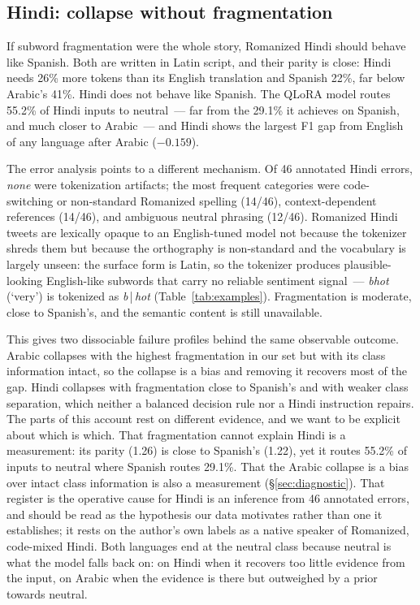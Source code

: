 \documentclass[11pt]{article}
\begin{document}
\subsection{Hindi: collapse without fragmentation}
\label{sec:hindi}

If subword fragmentation were the whole story, Romanized Hindi should behave like
Spanish. Both are written in Latin script, and their parity is close: Hindi needs
26\% more tokens than its English translation and Spanish 22\%, far below Arabic's
41\%. Hindi does not behave like Spanish. The QLoRA model routes 55.2\% of Hindi inputs to neutral~---
far from the 29.1\% it achieves on Spanish, and much closer to Arabic~--- and
Hindi shows the largest F1 gap from English of any language after Arabic
($-0.159$).

The error analysis points to a different mechanism. Of 46 annotated Hindi errors,
\emph{none} were tokenization artifacts; the most frequent categories were
code-switching or non-standard Romanized spelling (14/46), context-dependent
references (14/46), and ambiguous neutral phrasing (12/46). Romanized Hindi tweets are lexically opaque
to an English-tuned model not because the tokenizer shreds them but because the
orthography is non-standard and the vocabulary is largely unseen: the surface form
is Latin, so the tokenizer produces plausible-looking English-like subwords that
carry no reliable sentiment signal~--- \emph{bhot} (`very') is tokenized as
\emph{b}\,|\,\emph{hot} (Table~\ref{tab:examples}). Fragmentation is moderate, close to
Spanish's, and the semantic content is still unavailable.

This gives two dissociable failure profiles behind the same observable outcome.
Arabic collapses with the highest fragmentation in our set but with its class
information intact, so the collapse is a bias and removing it recovers most of the
gap. Hindi collapses with fragmentation close to Spanish's and with weaker class
separation, which neither a balanced decision rule nor a Hindi instruction repairs.
The parts of this account rest on different evidence, and we want to be explicit
about which is which. That fragmentation cannot explain Hindi is a measurement: its
parity (1.26) is close to Spanish's (1.22), yet it routes 55.2\% of inputs to
neutral where Spanish routes 29.1\%. That the Arabic collapse is a bias over intact
class information is also a measurement (\S\ref{sec:diagnostic}). That register is
the operative cause for Hindi is an inference from 46 annotated errors, and should
be read as the hypothesis our data motivates rather than one it establishes; it
rests on the author's own labels as a native speaker of Romanized, code-mixed Hindi.
Both languages end at the neutral class because neutral is what the model falls
back on: on Hindi when it recovers too little evidence from the input, on Arabic
when the evidence is there but outweighed by a prior towards neutral.
\end{document}

